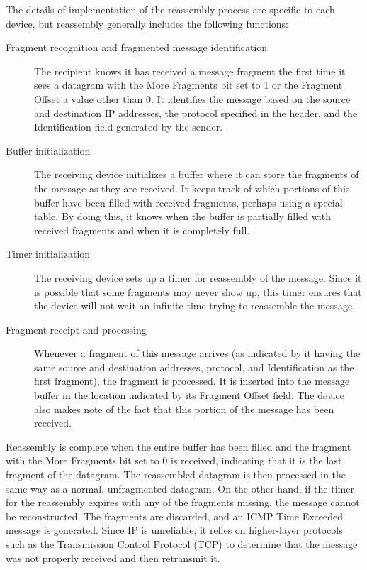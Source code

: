 The details of implementation of the reassembly process are specific to each device, but reassembly generally includes the following functions:
\begin{description}
\item[Fragment recognition and fragmented message identification]
   The recipient knows it has received a message fragment the first time it sees a datagram with the More Fragments bit set to 1 or the Fragment
Offset a value other than 0.
It identifies the message based on the source and destination IP addresses, the protocol specified in the
header, and the Identification field generated by the sender.

\item[Buffer initialization]
The receiving device initializes a buffer where it can store the fragments of the message as they are
received. It keeps track of which portions of this buffer have been
filled with received fragments, perhaps using a special table. By doing
this, it knows when the buffer is partially filled with received
fragments and when it is completely full.

\item[Timer initialization]
The receiving device sets up a timer for
reassembly of the message. Since it is possible that some fragments may
never show up, this timer ensures that the device will not wait an
infinite time trying to reassemble the message.

\item[Fragment receipt and processing]
Whenever a fragment of this message arrives (as indicated by it having the same source and
destination addresses, protocol, and Identification as the first
fragment), the fragment is processed. It is inserted into the message
buffer in the location indicated by its Fragment Offset field. The
device also makes note of the fact that this portion of the message has
been received.
\end{description}

Reassembly is complete when the entire buffer has been filled and the
fragment with the More Fragments bit set to 0 is received, indicating
that it is the last fragment of the datagram. The reassembled datagram
is then processed in the same way as a normal, unfragmented datagram. On
the other hand, if the timer for the reassembly expires with any of the
fragments missing, the message cannot be reconstructed. The fragments
are discarded, and an ICMP Time Exceeded message is generated. Since IP
is unreliable, it relies on higher-layer protocols such as the
Transmission Control Protocol (TCP) to determine that the message was
not properly received and then retransmit it.

